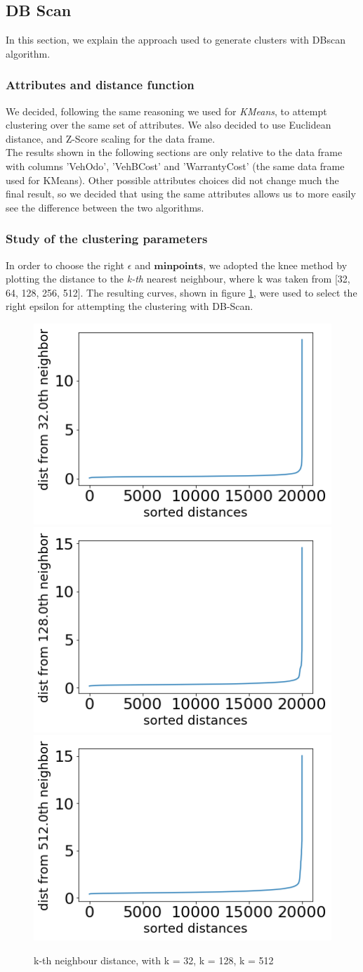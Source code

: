 \documentclass{article}
\begin{document}
	
	
	
	\subsection{DB Scan}
	In this section, we explain the approach used to generate clusters with DBscan algorithm.
	
	\subsubsection{Attributes and distance function}
	
	We decided, following the same reasoning we used for \emph{KMeans}, to attempt clustering over the same set of attributes. We also decided to use Euclidean distance, and Z-Score scaling for the data frame.\\
	The results shown in the following sections are only relative to the data frame with columns 'VehOdo', 'VehBCost' and 'WarrantyCost' (the same data frame used for KMeans). Other possible attributes choices did not change much the final result, so we decided that using the same attributes allows us to more easily see the difference between the two algorithms.
	
	\subsubsection{Study of the clustering parameters}
	In order to choose the right $\epsilon$ and $\mathbf{min points}$, we adopted the knee method by plotting the distance to the \emph{k-th} nearest neighbour, where k was taken from [32, 64, 128, 256, 512]. The resulting curves, shown in figure \ref{fig:kth}, were used to select the right epsilon for attempting the clustering with DB-Scan. 
	
	\begin{figure}[H]
		\centering
		\includegraphics[width=.32\textwidth]{a32}\hfill
		\includegraphics[width=.32\textwidth]{a128}\hfill
		\includegraphics[width=.32\textwidth]{a512}
		\caption{k-th neighbour distance, with k = 32, k = 128, k = 512}
		\label{fig:kth}
	\end{figure}
	
\end{document}
